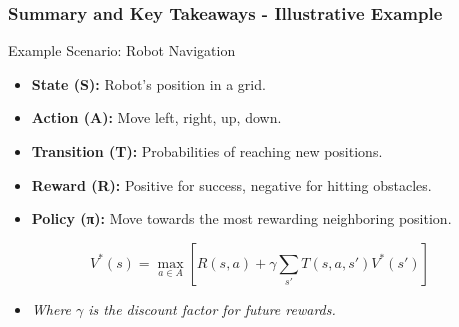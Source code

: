 \documentclass[aspectratio=169]{beamer}
\begin{document}
\begin{frame}[fragile]
  \frametitle{Summary and Key Takeaways - Illustrative Example}
  \begin{block}{Example Scenario: Robot Navigation}
    \begin{itemize}
      \item \textbf{State (S):} Robot's position in a grid.
      \item \textbf{Action (A):} Move left, right, up, down.
      \item \textbf{Transition (T):} Probabilities of reaching new positions.
      \item \textbf{Reward (R):} Positive for success, negative for hitting obstacles.
      \item \textbf{Policy (π):} Move towards the most rewarding neighboring position.
    \end{itemize}
  \end{block}
  
  \begin{equation}
  V^*(s) = \max_{a \in A}\left[ R(s, a) + \gamma \sum_{s'} T(s, a, s')V^*(s') \right]
  \end{equation}
  \begin{itemize}
    \item \textit{Where $\gamma$ is the discount factor for future rewards.}
  \end{itemize}
\end{frame}
\end{document}
